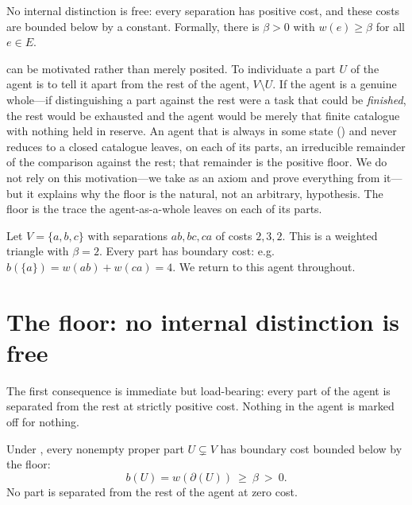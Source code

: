 \documentclass[11pt,twocolumn,a4paper]{article}
\newcommand{\V}{V}
\newcommand{\E}{E}
\newcommand{\wt}{w}
\newcommand{\floorc}{\beta}          %
\newcommand{\cut}{\partial}
\begin{document}
\begin{axiom}
\label{ax:costly}
No internal distinction is free: every separation has positive cost, and
these costs are bounded below by a constant. Formally, there is
$\floorc>0$ with $\wt(e)\ge\floorc$ for all $e\in\E$.
\end{axiom}

\begin{remark}
\label{rem:costly-earned}
 can be motivated rather than merely posited. To
individuate a part $U$ of the agent is to tell it apart from the rest of
the agent, $\V\setminus U$. If the agent is a genuine whole---if
distinguishing a part against the rest were a task that could be
\emph{finished}, the rest would be exhausted and the agent would be
merely that finite catalogue with nothing held in reserve. An agent that
is always in some state () and never reduces to a closed
catalogue leaves, on each of its parts, an irreducible remainder of the
comparison against the rest; that remainder is the positive floor. We do
not rely on this motivation---we take  as an axiom and
prove everything from it---but it explains why the floor is the natural,
not an arbitrary, hypothesis. The floor is the trace the agent-as-a-whole
leaves on each of its parts.
\end{remark}

\begin{example}
\label{ex:threemood}
Let $\V=\{a,b,c\}$ with separations $ab,bc,ca$ of costs $2,3,2$. This is a
weighted triangle with $\floorc=2$. Every part has boundary cost: e.g.
$b(\{a\})=\wt(ab)+\wt(ca)=4$. We return to this agent throughout.
\end{example}

\section{The floor: no internal distinction is free}
\label{sec:floor}

The first consequence is immediate but load-bearing: every part of the
agent is separated from the rest at strictly positive cost. Nothing in
the agent is marked off for nothing.

\begin{theorem}[Floor]
\label{thm:floor}
Under , every nonempty proper part
$U\subsetneq\V$ has boundary cost bounded below by the floor:
\[
b(U)=\wt(\cut(U))\ \ge\ \floorc\ >\ 0.
\]
No part is separated from the rest of the agent at zero cost.
\end{theorem}
\end{document}
